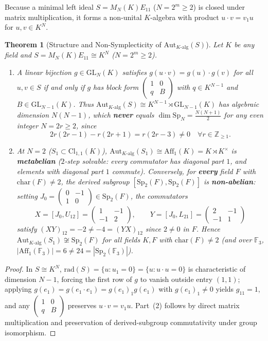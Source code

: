 \documentclass[11pt,a4paper]{article}
\newcommand{\smat}[4]{\left(\begin{smallmatrix}#1&#2\\#3&#4\end{smallmatrix}\right)}
\newtheorem{theorem}{Theorem}[section]
\theoremstyle{definition}
\newcommand{\Cl}{\mathrm{Cl}}
\newcommand{\Aut}{\mathrm{Aut}}
\newcommand{\GL}{\mathrm{GL}}
\newcommand{\Sp}{\mathrm{Sp}}
\newcommand{\Aff}{\mathrm{Aff}}
\newcommand{\rad}{\mathrm{rad}}
\begin{document}
Because a minimal left ideal $S = M_N(K)E_{11}$ ($N = 2^m \ge 2$) is closed under matrix multiplication, it forms a non-unital $K$-algebra with product $u \cdot v = v_1 u$ for $u, v \in K^N$.

\begin{theorem}[Structure and Non-Symplecticity of $\Aut_{K\text{-alg}}(S)$]\label{thm:s1alg}
Let $K$ be any field and $S = M_N(K)E_{11} \cong K^N$ ($N = 2^m \ge 2$).
\begin{enumerate}
  \item[(1)] A linear bijection $g \in \GL_N(K)$ satisfies $g(u \cdot v) = g(u) \cdot g(v)$ for all $u, v \in S$ if and only if $g$ has block form $\smat{1}{0}{q}{B}$ with $q \in K^{N-1}$ and $B \in \GL_{N-1}(K)$. Thus $\Aut_{K\text{-alg}}(S) \cong K^{N-1} \rtimes \GL_{N-1}(K)$ has algebraic dimension $N(N - 1)$, which \textbf{never} equals $\dim \Sp_N = \frac{N(N+1)}{2}$ for any even integer $N = 2r \ge 2$, since
  \[
    2r(2r - 1) - r(2r + 1) = r(2r - 3) \neq 0 \quad \forall r \in \mathbb{Z}_{\ge 1}.
  \]
  \item[(2)] At $N = 2$ ($S_1 \subset \Cl_{1,1}(K)$), $\Aut_{K\text{-alg}}(S_1) \cong \Aff_1(K) = K \rtimes K^\times$ is \textbf{metabelian} ($2$-step solvable: every commutator has diagonal part $1$, and elements with diagonal part $1$ commute). Conversely, for \textbf{every} field $F$ with $\mathrm{char}(F) \neq 2$, the derived subgroup $[\Sp_2(F), \Sp_2(F)]$ is \textbf{non-abelian}: setting $J_0 = \smat{0}{-1}{1}{0} \in \Sp_2(F)$, the commutators
  \[
    X = [J_0, U_{12}] = \begin{pmatrix} 1 & -1 \\ -1 & 2 \end{pmatrix}, \qquad
    Y = [J_0, L_{21}] = \begin{pmatrix} 2 & -1 \\ -1 & 1 \end{pmatrix}
  \]
  satisfy $(XY)_{12} = -2 \neq -4 = (YX)_{12}$ since $2 \neq 0$ in $F$. Hence $\Aut_{K\text{-alg}}(S_1) \not\cong \Sp_2(F)$ for all fields $K, F$ with $\mathrm{char}(F) \neq 2$ (and over $\mathbb{F}_3$, $|\Aff_1(\mathbb{F}_3)| = 6 \neq 24 = |\Sp_2(\mathbb{F}_3)|$).
\end{enumerate}
\end{theorem}

\begin{proof}
In $S \cong K^N$, $\rad(S) = \{u : u_1 = 0\} = \{u : u \cdot u = 0\}$ is characteristic of dimension $N - 1$, forcing the first row of $g$ to vanish outside entry $(1,1)$; applying $g(e_1) = g(e_1 \cdot e_1) = g(e_1)_1 g(e_1)$ with $g(e_1)_1 \neq 0$ yields $g_{11} = 1$, and any $\smat{1}{0}{q}{B}$ preserves $u \cdot v = v_1 u$. Part~(2) follows by direct matrix multiplication and preservation of derived-subgroup commutativity under group isomorphism.
\end{proof}
\end{document}
